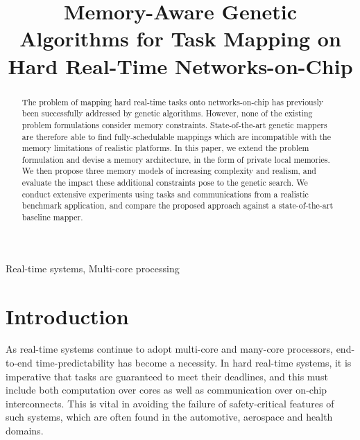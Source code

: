 \documentclass[conference]{IEEEtran}
\begin{document}
\title{Memory-Aware Genetic Algorithms for Task Mapping on Hard Real-Time Networks-on-Chip}

\author{
}

\maketitle

\begin{abstract}
The problem of mapping hard real-time tasks onto networks-on-chip has previously been successfully addressed by genetic algorithms. However, none of the existing problem formulations consider memory constraints. State-of-the-art genetic mappers are therefore able to find fully-schedulable mappings which are incompatible with the memory limitations of realistic platforms. In this paper, we extend the problem formulation and devise a memory architecture, in the form of private local memories. We then propose three memory models of increasing complexity and realism, and evaluate the impact these additional constraints pose to the genetic search. We conduct extensive experiments using tasks and communications from a realistic benchmark application, and compare the proposed approach against a state-of-the-art baseline mapper.
\end{abstract}

\begin{IEEEkeywords}
Real-time systems, Multi-core processing
\end{IEEEkeywords}

\section{Introduction}\label{introduction}

As real-time systems continue to adopt multi-core and many-core processors, end-to-end time-predictability has become a necessity. In hard real-time systems, it is imperative that tasks are guaranteed to meet their deadlines, and this must include both computation over cores as well as communication over on-chip interconnects. This is vital in avoiding the failure of safety-critical features of such systems, which are often found in the automotive, aerospace and health domains. 
\end{document}

